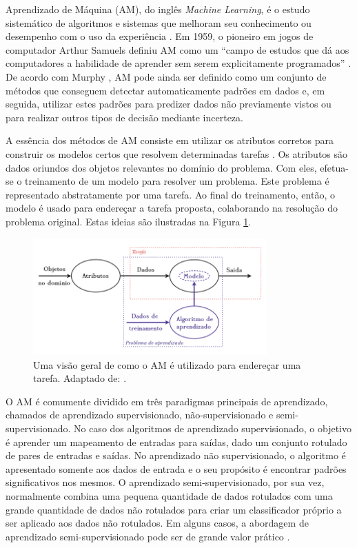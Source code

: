 
Aprendizado de Máquina (AM), do inglês \emph{Machine Learning}, é o estudo sistemático de algoritmos e sistemas que melhoram seu conhecimento ou desempenho com o uso da experiência \cite{flach}. Em 1959, o pioneiro em jogos de computador Arthur Samuels definiu AM como um ``campo de estudos que dá aos computadores a habilidade de aprender sem serem explicitamente programados'' \cite{simon}. De acordo com Murphy \cite{murphy} , AM pode ainda ser definido como um conjunto de métodos que conseguem detectar automaticamente padrões em dados e, em seguida, utilizar estes padrões para predizer dados não previamente vistos ou para realizar outros tipos de decisão mediante incerteza.

A essência dos métodos de AM consiste em utilizar os atributos corretos para construir os modelos certos que resolvem determinadas tarefas \cite{flach}. Os atributos são dados oriundos dos objetos relevantes no domínio do problema. Com eles, efetua-se o treinamento de um modelo para resolver um problema. Este problema é representado abstratamente por uma tarefa. Ao final do treinamento, então, o modelo é usado para endereçar a tarefa  proposta, colaborando na resolução do problema original. Estas ideias são ilustradas na Figura  \ref{fig:tasks}.


\begin{figure}[h!]
\centering
\caption{Uma visão geral de como o AM é utilizado para endereçar uma tarefa. Adaptado de: \cite{flach}.}
\label{fig:tasks}
\includegraphics[width=0.8\textwidth]{imgs/tasks}
\end{figure}

O AM é comumente dividido em três paradigmas principais de aprendizado, chamados de aprendizado supervisionado, não-supervisionado e semi-supervisionado. No caso dos algoritmos de aprendizado supervisionado, o objetivo é aprender um mapeamento de entradas para saídas, dado um conjunto rotulado de pares de entradas e saídas. No aprendizado não supervisionado, o algoritmo é apresentado somente aos dados de entrada e o seu propósito é encontrar padrões significativos nos mesmos. O aprendizado semi-supervisionado, por sua vez, normalmente combina uma pequena quantidade de dados rotulados com uma grande quantidade de dados não rotulados para criar um classificador próprio a ser aplicado aos dados não rotulados. Em alguns casos, a abordagem de aprendizado semi-supervisionado pode ser de grande valor prático \cite{khan}.

